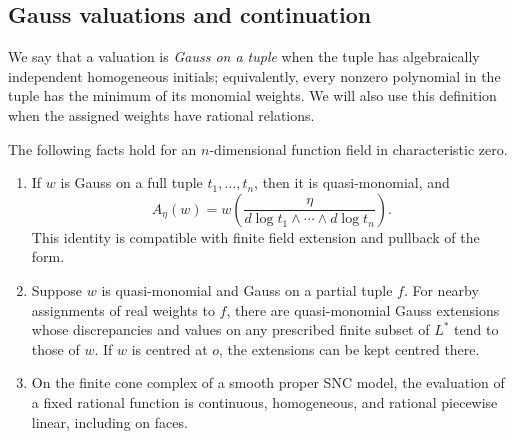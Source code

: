 \subsection{Gauss valuations and continuation}

We say that a valuation is \emph{Gauss on a tuple} when the tuple has
algebraically independent homogeneous initials; equivalently, every
nonzero polynomial in the tuple has the minimum of its monomial
weights. We will also use this definition when the assigned weights
have rational relations.

\begin{lemma}\label{val:gauss-tools}
The following facts hold for an $n$-dimensional function field in
characteristic zero.
\begin{enumerate}[label=\textup{(\roman*)}]
\item If $w$ is Gauss on a full tuple $t_1,\ldots,t_n$, then it is
quasi-monomial, and
\begin{equation}\label{val:log-frame}
 A_\eta(w)=w\!\left(
 \frac{\eta}{d\log t_1\wedge\cdots\wedge d\log t_n}\right).
\end{equation}
This identity is compatible with finite field extension and pullback
of the form.
\item Suppose $w$ is quasi-monomial and Gauss on a partial tuple $f$.
For nearby assignments of real weights to $f$, there are
quasi-monomial Gauss extensions whose discrepancies and values on any
prescribed finite subset of $L^*$ tend to those of $w$. If $w$ is
centred at $o$, the extensions can be kept centred there.
\item On the finite cone complex of a smooth proper SNC model, the
evaluation of a fixed rational function is continuous, homogeneous,
and rational piecewise linear, including on faces.
\end{enumerate}
\end{lemma}


